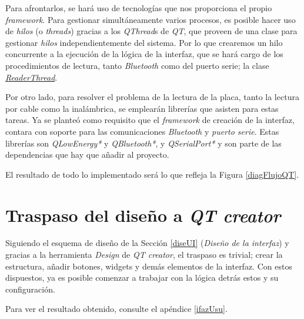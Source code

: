 Para afrontarlos, se hará uso de tecnologías que nos proporciona el propio
\textit{framework}. Para gestionar simultáneamente varios procesos, es
posible hacer uso de \textit{hilos} (o \textit{threads}) gracias a los
\textit{QThread}s de \textit{QT}, que proveen de una clase para gestionar
\textit{hilos} independientemente del sistema. Por lo que crearemos un
hilo concurrente a la ejecución de la lógica de la interfaz, que se hará
cargo de los procedimientos de lectura, tanto \textit{Bluetooth} como del
puerto serie; la clase
\href{https://github.com/AntonioPriego/SmartPen/blob/main/SmartPenUI/readerthread.cpp}{\textit{ReaderThread}}.

Por otro lado, para resolver el problema de la lectura de la placa,
tanto la lectura por cable como la inalámbrica, se emplearán
librerías que asisten para estas tareas. Ya se planteó como requisito
que el \textit{framework} de creación de la interfaz, contara con
soporte para las comunicaciones \textit{Bluetooth} y
\textit{puerto serie}. Estas librerías son \textit{QLowEnergy*} y
\textit{QBluetooth*}, y \textit{QSerialPort*} y son parte de las dependencias
que hay que añadir al proyecto.

El resultado de todo lo implementado será lo que refleja la Figura \ref{diagFlujoQT}.

\section{Traspaso del diseño a \textit{QT creator}\label{trasaQT}}
Siguiendo el esquema de diseño de la Sección \ref{diseUI} (\textit{Diseño de la interfaz})
y gracias a la herramienta \textit{Design} de \textit{QT creator},
el traspaso es trivial; crear la estructura, añadir botones, widgets
y demás elementos de la interfaz. Con estos dispuestos, ya es posible
comenzar a trabajar con la lógica detrás estos y su configuración.

Para ver el resultado obtenido, consulte el apéndice \ref{ifazUsu}.

